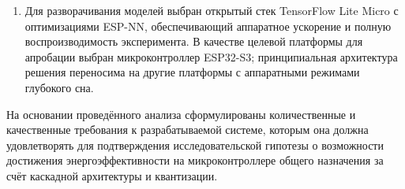 \begin{enumerate}
	      модели 80--500~КБ в зависимости от варианта масштабирования и
	      эффективную утилизацию SIMD-инструкций целевой платформы.
	      Квантизация INT8 обеспечивает сжатие модели до $4\times$ и
	      ускорение инференса при потере точности менее 1 процентного
	      пункта; сравнение методов PTQ и QAT на конкретной модели и
	      платформе сохраняет самостоятельный исследовательский интерес;
	\item Для разворачивания моделей выбран открытый стек TensorFlow Lite
	      Micro с оптимизациями ESP-NN, обеспечивающий аппаратное
	      ускорение и полную воспроизводимость эксперимента. В качестве
	      целевой платформы для апробации выбран микроконтроллер
	      ESP32-S3; принципиальная архитектура решения переносима на
	      другие платформы с аппаратными режимами глубокого сна.
\end{enumerate}

На основании проведённого анализа сформулированы количественные и
качественные требования к разрабатываемой системе, которым она должна
удовлетворять для подтверждения исследовательской гипотезы о возможности
достижения энергоэффективности на микроконтроллере общего назначения за
счёт каскадной архитектуры и квантизации.

